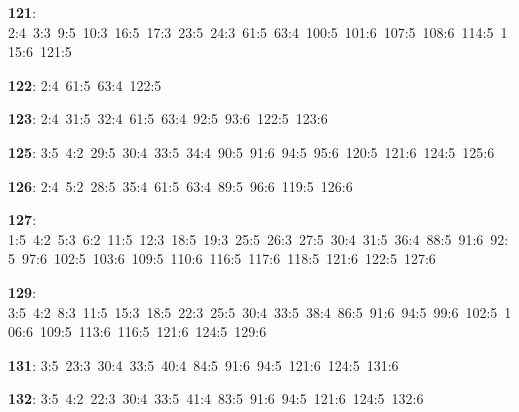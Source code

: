 \noindent \textbf{121}: 2:4\allowbreak\ 3:3\allowbreak\ 9:5\allowbreak\ 10:3\allowbreak\ 16:5\allowbreak\ 17:3\allowbreak\ 23:5\allowbreak\ 24:3\allowbreak\ 61:5\allowbreak\ 63:4\allowbreak\ 100:5\allowbreak\ 101:6\allowbreak\ 107:5\allowbreak\ 108:6\allowbreak\ 114:5\allowbreak\ 115:6\allowbreak\ 121:5\par
\noindent \textbf{122}: 2:4\allowbreak\ 61:5\allowbreak\ 63:4\allowbreak\ 122:5\par
\noindent \textbf{123}: 2:4\allowbreak\ 31:5\allowbreak\ 32:4\allowbreak\ 61:5\allowbreak\ 63:4\allowbreak\ 92:5\allowbreak\ 93:6\allowbreak\ 122:5\allowbreak\ 123:6\par
\noindent \textbf{125}: 3:5\allowbreak\ 4:2\allowbreak\ 29:5\allowbreak\ 30:4\allowbreak\ 33:5\allowbreak\ 34:4\allowbreak\ 90:5\allowbreak\ 91:6\allowbreak\ 94:5\allowbreak\ 95:6\allowbreak\ 120:5\allowbreak\ 121:6\allowbreak\ 124:5\allowbreak\ 125:6\par
\noindent \textbf{126}: 2:4\allowbreak\ 5:2\allowbreak\ 28:5\allowbreak\ 35:4\allowbreak\ 61:5\allowbreak\ 63:4\allowbreak\ 89:5\allowbreak\ 96:6\allowbreak\ 119:5\allowbreak\ 126:6\par
\noindent \textbf{127}: 1:5\allowbreak\ 4:2\allowbreak\ 5:3\allowbreak\ 6:2\allowbreak\ 11:5\allowbreak\ 12:3\allowbreak\ 18:5\allowbreak\ 19:3\allowbreak\ 25:5\allowbreak\ 26:3\allowbreak\ 27:5\allowbreak\ 30:4\allowbreak\ 31:5\allowbreak\ 36:4\allowbreak\ 88:5\allowbreak\ 91:6\allowbreak\ 92:5\allowbreak\ 97:6\allowbreak\ 102:5\allowbreak\ 103:6\allowbreak\ 109:5\allowbreak\ 110:6\allowbreak\ 116:5\allowbreak\ 117:6\allowbreak\ 118:5\allowbreak\ 121:6\allowbreak\ 122:5\allowbreak\ 127:6\par
\noindent \textbf{129}: 3:5\allowbreak\ 4:2\allowbreak\ 8:3\allowbreak\ 11:5\allowbreak\ 15:3\allowbreak\ 18:5\allowbreak\ 22:3\allowbreak\ 25:5\allowbreak\ 30:4\allowbreak\ 33:5\allowbreak\ 38:4\allowbreak\ 86:5\allowbreak\ 91:6\allowbreak\ 94:5\allowbreak\ 99:6\allowbreak\ 102:5\allowbreak\ 106:6\allowbreak\ 109:5\allowbreak\ 113:6\allowbreak\ 116:5\allowbreak\ 121:6\allowbreak\ 124:5\allowbreak\ 129:6\par
\noindent \textbf{131}: 3:5\allowbreak\ 23:3\allowbreak\ 30:4\allowbreak\ 33:5\allowbreak\ 40:4\allowbreak\ 84:5\allowbreak\ 91:6\allowbreak\ 94:5\allowbreak\ 121:6\allowbreak\ 124:5\allowbreak\ 131:6\par
\noindent \textbf{132}: 3:5\allowbreak\ 4:2\allowbreak\ 22:3\allowbreak\ 30:4\allowbreak\ 33:5\allowbreak\ 41:4\allowbreak\ 83:5\allowbreak\ 91:6\allowbreak\ 94:5\allowbreak\ 121:6\allowbreak\ 124:5\allowbreak\ 132:6\par
